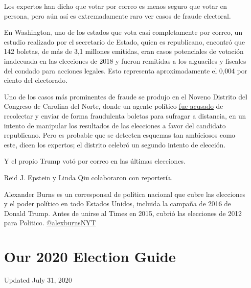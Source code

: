 Los expertos han dicho que votar por correo es menos seguro que votar en
persona, pero aún así es extremadamente raro ver casos de fraude
electoral.

En Washington, uno de los estados que vota casi completamente por
correo, un estudio realizado por el secretario de Estado, quien es
republicano, encontró que 142 boletas, de más de 3,1 millones emitidas,
eran casos potenciales de votación inadecuada en las elecciones de 2018
y fueron remitidas a los alguaciles y fiscales del condado para acciones
legales. Esto representa aproximadamente el 0,004 por ciento del
electorado.

Uno de los casos más prominentes de fraude se produjo en el Noveno
Distrito del Congreso de Carolina del Norte, donde un agente político
\href{https://www.nytimes3xbfgragh.onion/2019/07/30/us/mccrae-dowless-indictment.html}{fue
acusado} de recolectar y enviar de forma fraudulenta boletas para
sufragar a distancia, en un intento de manipular los resultados de las
elecciones a favor del candidato republicano. Pero es probable que se
detecten esquemas tan ambiciosos como este, dicen los expertos; el
distrito celebró un segundo intento de elección.

Y el propio Trump votó por correo en las últimas elecciones.

Reid J. Epstein y Linda Qiu colaboraron con reportería.

Alexander Burns es un corresponsal de política nacional que cubre las
elecciones y el poder político en todo Estados Unidos, incluida la
campaña de 2016 de Donald Trump. Antes de unirse al Times en 2015,
cubrió las elecciones de 2012 para Politico.
\href{https://twitter.com/alexburnsNYT}{@alexburnsNYT}

\hypertarget{our-2020-election-guide}{%
\section{Our 2020 Election Guide}\label{our-2020-election-guide}}

Updated July 31, 2020

